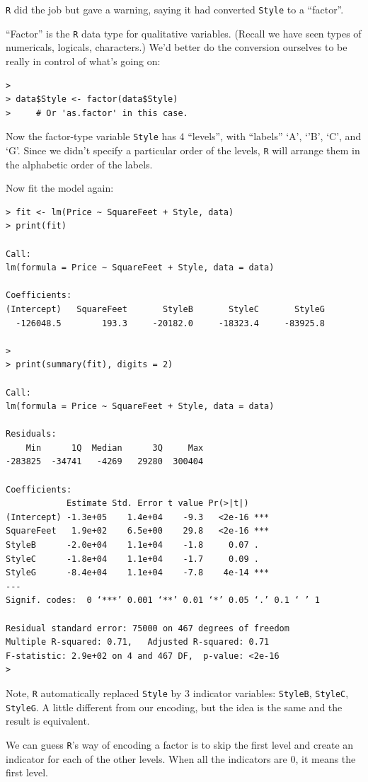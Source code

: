 \documentclass[12pt]{article}
\begin{document}
\texttt{R} did the job but gave a warning, saying
it had converted \verb+Style+ to a ``factor''.

``Factor'' is the \texttt{R} data type for qualitative variables.
(Recall we have seen types of numericals, logicals, characters.)
We'd better do the conversion ourselves to be really in control of
what's going on:

\begin{verbatim}
> 
> data$Style <- factor(data$Style)
>     # Or 'as.factor' in this case.
\end{verbatim}

Now the factor-type variable \verb+Style+
has 4 ``levels'', with ``labels'' `A', `'B', `C', and `G'.
Since we didn't specify a particular order of the levels,
\texttt{R} will arrange them in the alphabetic order of the labels.

Now fit the model again:
\begin{verbatim}
> fit <- lm(Price ~ SquareFeet + Style, data)
> print(fit)

Call:
lm(formula = Price ~ SquareFeet + Style, data = data)

Coefficients:
(Intercept)   SquareFeet       StyleB       StyleC       StyleG  
  -126048.5        193.3     -20182.0     -18323.4     -83925.8  

> 
> print(summary(fit), digits = 2)

Call:
lm(formula = Price ~ SquareFeet + Style, data = data)

Residuals:
    Min      1Q  Median      3Q     Max 
-283825  -34741   -4269   29280  300404 

Coefficients:
            Estimate Std. Error t value Pr(>|t|)    
(Intercept) -1.3e+05    1.4e+04    -9.3   <2e-16 ***
SquareFeet   1.9e+02    6.5e+00    29.8   <2e-16 ***
StyleB      -2.0e+04    1.1e+04    -1.8     0.07 .  
StyleC      -1.8e+04    1.1e+04    -1.7     0.09 .  
StyleG      -8.4e+04    1.1e+04    -7.8    4e-14 ***
---
Signif. codes:  0 ‘***’ 0.001 ‘**’ 0.01 ‘*’ 0.05 ‘.’ 0.1 ‘ ’ 1 

Residual standard error: 75000 on 467 degrees of freedom
Multiple R-squared: 0.71,	Adjusted R-squared: 0.71 
F-statistic: 2.9e+02 on 4 and 467 DF,  p-value: <2e-16 
> 
\end{verbatim}

Note, \texttt{R} automatically replaced \verb+Style+ by 3 indicator
variables: \verb+StyleB+, \verb+StyleC+, \verb+StyleG+.
A little different from our encoding, but the idea is the same and the
result is equivalent.

We can guess \texttt{R}'s way of encoding a factor is
to skip the first level and create an indicator for each of the other
levels. When all the indicators are 0, it means the first level.
\end{document}
